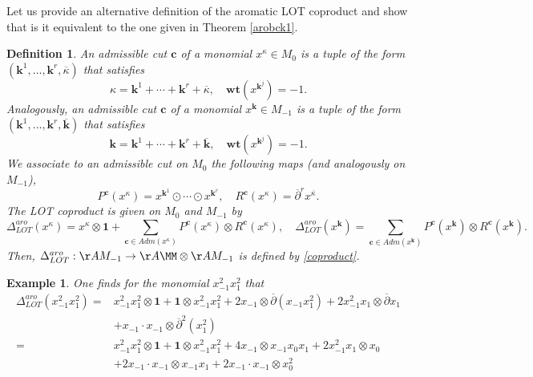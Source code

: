 \documentclass[a4paper,11pt]{article}
\newtheorem{definition}[theorem]{Definition}
\newtheorem{ex}[theorem]{Example}
\begin{document}
Let us provide an alternative definition of the aromatic LOT coproduct and show that is it equivalent to the one given in Theorem \ref{arobck1}.
\begin{definition}\label{admcutmonomial}
An admissible cut $\mathbf c$ of a monomial $x^{\kappa}\in M_0$ is a tuple of the form $(\mathbf k^1,\dots, \mathbf k^r,\overline{\kappa})$ that satisfies
\[\kappa=\mathbf k^1+\cdots+\mathbf k^r+\overline{\kappa},
\quad
\mathbf{wt}(x^{\mathbf k^j})=-1.
\]
Analogously, an admissible cut $\mathbf c$ of a monomial $x^{\mathbf k}\in M_{-1}$ is a tuple of the form $(\mathbf k^1,\dots, \mathbf k^r,\overline{\mathbf k})$ that satisfies
\[\mathbf k=\mathbf k^1+\cdots+\mathbf k^r+\overline{\mathbf k},
\quad
\mathbf{wt}(x^{\mathbf k^j})=-1.
\]
We associate to an admissible cut on $M_0$ the following maps (and analogously on $M_{-1}$),
\[
P^{\mathbf c}(x^{\kappa})=x^{\mathbf k^1}\odot \cdots \odot x^{\mathbf k^r},\quad
R^{\mathbf c}(x^{\kappa})=\overline{\partial}^r x^{\overline{\kappa}}.
\]
The LOT coproduct is given on $M_0$ and $M_{-1}$ by
\[\Delta_{LOT}^{aro}(x^{\kappa})=x^{\kappa}\otimes \mathbf{1}+\sum_{\mathbf c \in Adm(x^{\kappa})} P^{\mathbf c}(x^{\kappa})\otimes R^{\mathbf c}(x^{\kappa}),\quad
\Delta_{LOT}^{aro}(x^{\mathbf k})=\sum_{\mathbf c \in Adm(x^{\mathbf k})} P^{\mathbf c}(x^{\mathbf k})\otimes R^{\mathbf c}(x^{\mathbf k}).\]
Then, $\Delta_{LOT}^{aro}: \AA M_{-1} \rightarrow \AA\MM\otimes \AA M_{-1}$ is defined by \eqref{coproduct}.
\end{definition}

\begin{ex}
One finds for the monomial $x_{-1}^2x_{1}^2$ that
\begin{align*}
\Delta_{LOT}^{aro}(x_{-1}^2x_{1}^2)  =& x_{-1}^2x_{1}^2\otimes \mathbf 1 + \mathbf 1\otimes x_{-1}^2x_{1}^2 + 2x_{-1}\otimes \overline{\partial}(x_{-1}x_{1}^2) + 2x_{-1}^2x_{1}\otimes \overline{\partial}x_{1}\\
&   + x_{-1}\cdot x_{-1}\otimes \overline{\partial}^2(x_{1}^2)\\
 = & x_{-1}^2x_{1}^2 \otimes \mathbf 1 + \mathbf 1 \otimes x_{-1}^2x_{1}^2 + 4x_{-1}\otimes x_{-1}x_{0}x_{1} + 2x_{-1}^2x_{1}\otimes x_{0}\\
&   + 2x_{-1}\cdot x_{-1}\otimes x_{-1}x_{1} + 2x_{-1}\cdot x_{-1}\otimes x_{0}^2
\end{align*}
\end{ex}
\end{document}
